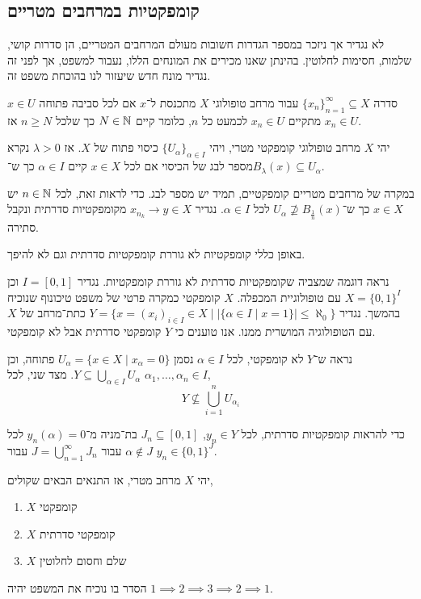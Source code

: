 \subsection{קומפקטיות במרחבים מטריים}
לא נגדיר אך ניזכר במספר הגדרות חשובות מעולם המרחבים המטריים, הן סדרות קושי, שלמות, חסימות לחלוטין.
בהינתן שאנו מכירים את המונחים הללו, נעבור למשפט, אך לפני זה נגדיר מונח חדש שיעזור לנו בהוכחת משפט זה.
\begin{definition}
	סדרה ${\{ x_n \}}_{n = 1}^\infty \subseteq X$ עבור מרחב טופולוגי $X$ מתכנסת ל־$x$ אם לכל סביבה פתוחה $x \in U$ מתקיים $x_n \in U$ לכמעט כל $n$, כלומר קיים $N \in \mathbb{N}$ כך שלכל $n \ge N$ אז $x_n \in U$.
\end{definition}
\begin{definition}
	יהי $X$ מרחב טופולוגי קומפקטי מטרי, ויהי ${\{ U_{\alpha} \}}_{\alpha \in I}$ כיסוי פתוח של $X$.
	אז $\lambda > 0$ נקרא מספר לבג של הכיסוי אם לכל $x \in X$ קיים $\alpha \in I$ כך ש־$B_{\lambda}(x) \subseteq U_{\alpha}$.
\end{definition}
\begin{remark}
	במקרה של מרחבים מטריים קומפקטיים, תמיד יש מספר לבג.
	כדי לראות זאת, לכל $n \in \mathbb{N}$ יש $x \in X$ כך ש־$U_{\alpha} \not\supseteq B_{\frac{1}{n}}(x)$ לכל $\alpha \in I$.
	נגדיר $x_{n_k} \to y \in X$ מקומפקטיות סדרתית ונקבל סתירה.
\end{remark}
\begin{remark}
	באופן כללי קומפקטיות לא גוררת קומפקטיות סדרתית וגם לא להיפך.
\end{remark}
\begin{example}
	נראה דוגמה שמצביה שקומפקטיות סדרתית לא גוררת קומפקטיות.
	נגדיר $I = [0, 1]$ וכן $X = {\{0, 1\}}^I$ עם טופולוגיית המכפלה.
	$X$ קומפקטי כמקרה פרטי של משפט טיכונוף שנוכיח בהמשך.
	נגדיר $Y = \{ x = {(x_i)}_{i \in I} \in X \mid |\{ \alpha \in I \mid x = 1\}| \le \aleph_0 \}$ כתת־מרחב של $X$ עם הטופולוגיה המושרית ממנו.
	אנו טוענים כי $Y$ קומפקטי סדרתית אבל לא קומפקטי.

	נראה ש־$Y$ לא קומפקטי, לכל $\alpha \in I$ נסמן $U_{\alpha} = \{ x \in X \mid x_{\alpha} = 0 \}$ פתוחה, וכן $Y \subseteq \bigcup_{\alpha \in I} U_{\alpha}$.
	מצד שני, לכל $\alpha_1, \ldots, \alpha_n \in I$,
	\[
		Y \not\subseteq \bigcup_{i = 1}^n U_{\alpha_i}
	\]

	כדי להראות קומפקטיות סדרתית, לכל $y_n \in Y$, $J_n \subseteq [0, 1]$ בת־מניה מ־$y_n(\alpha) = 0$ לכל $\alpha \notin J$ עבור $J = \bigcup_{n = 1}^\infty J_n$ עבור $y_n \in {\{0, 1\}}^J$.
\end{example}
\begin{theorem}
	יהי $X$ מרחב מטרי, אז התנאים הבאים שקולים,
	\begin{enumerate}
		\item $X$ קומפקטי
		\item $X$ קומפקטי סדרתית
		\item $X$ שלם וחסום לחלוטין
	\end{enumerate}
\end{theorem}
הסדר בו נוכיח את המשפט יהיה $1 \implies 2 \implies 3 \implies 2 \implies 1$.

\listoftheorems[title=הגדרות ומשפטים,ignoreall,show={theorem,definition},swapnumber,onlynamed={proposition}]



